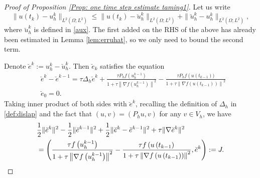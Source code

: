 \documentclass[10pt,a4paper]{amsart}
\begin{document}
\begin{proof}[Proof of Proposition \ref{Prop: one time  step estimate taming1}]
Let us write
$$
\|u(t_k)-u_h^k\|_{L^2(\Omega;L^2)}\leq \|u(t_k)-\breve{u}_h^k\|_{L^2(\Omega;L^2)}+\|\breve{u}_h^k-u_h^k\|_{L^2(\Omega;L^2)}, 
$$
where $\breve{u}_h^k$ is defined in \eqref{aux}. The first added on the RHS of the above has already been estimated in  Lemma \ref{lem:erruhat}, so we only need to bound the second term. 

Denote $\breve{e}^k:=u_h^k-\breve{u}_h^k$. Then $\breve{e}_k$ satisfies the equation
\begin{align}
& \breve{e}^k-\breve{e}^{k-1}= \tau \Delta_h \breve{e}^k+\frac{\tau P_hf\left(u_h^{k-1}\right)}{1+\tau\left\|\nabla f\left(u_h^{k-1}\right)\right\|^2}-\frac{\tau P_h f\left(u\left(t_{k-1}\right))\right.}{1+\tau\left\|\nabla f\left(u\left(t_{k-1}\right)\right)\right\|^2} \\
& \breve{e}_0=0 .
\end{align}
Taking inner product of both sides with $\breve{e}^k$,  recalling the definition of $\Delta_h$ in \eqref{def:dislap} and the fact that $(u,v)=(P_hu,v)$ for any $ v\in V_h$, we have 
\begin{align}\label{eq:J}
& \frac{1}{2}\|\breve{e}^k\|^2-\frac{1}{2}\|\breve{e}^{k-1}\|^2+\frac{1}{2}\|\breve{e}^k-\breve{e}^{k-1}\|^2+\tau\|\nabla \breve{e}^k\|^2\notag \\
& =\left(\frac{\tau f\left(u_h^{k-1}\right)}{1+\tau\left\|\nabla f\left(u_h^{k-1}\right)\right\|^2}-\frac{\tau f\left(u\left(t_{k-1}\right)\right.}{1+\tau\left\|\nabla f\left(u\left(t_{k-1}\right)\right)\right\|^2}, \breve{e}^k\right):=J.
\end{align}


\end{proof}
\end{document}

